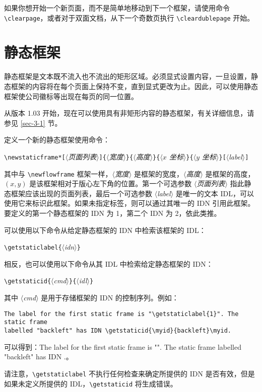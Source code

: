 \documentclass[a4paper]{book}%
\newcommand{\meta}[1]{\textnormal{\ensuremath{\langle}\makebox[0pt][l]{}\emph{#1}\makebox[0pt][l]{}\ensuremath{\rangle}}}
\begin{document}
如果你想开始一个新页面，而不是简单地移动到下一个框架，请使用命令 \verb|\clearpage|，或者对于双面文档，从下一个奇数页执行 \verb|\cleardublepage| 开始。
\section{静态框架}\label{sec-2-2}%
静态框架是文本既不流入也不流出的矩形区域。必须显式设置内容，一旦设置，静态框架的内容将在每个页面上保持不变，直到显式更改为止。因此，可以使用静态框架使公司徽标等出现在每页的同一位置。

从版本 1.03 开始，现在可以使用具有非矩形内容的静态框架，有关详细信息，请参见 \ref{sec-3-1} 节。

定义一个新的静态框架使用命令：
\begin{mdframed}
\verb|\newstaticframe*[|\meta{页面列表}\verb|]{|\meta{宽度}\verb|}{|\meta{高度}\verb|}{|\meta{$x$ 坐标}\verb|}{|\meta{$y$ 坐标}\verb|}[|\meta{label}\verb|]|
\end{mdframed}
其中与 \verb|\newflowframe| 框架一样，\meta{宽度} 是框架的宽度，\meta{高度} 是框架的高度，$(x,y)$ 是该框架相对于版心左下角的位置。第一个可选参数 \meta{页面列表} 指此静态框架应该出现的页面列表，最后一个可选参数 \meta{label} 是唯一的文本 IDL，可以使用它来标识此框架。如果未指定标签，则可以通过其唯一的 IDN 引用此框架。要定义的第一个静态框架的 IDN 为 1，第二个 IDN 为 2，依此类推。

可以使用以下命令从给定静态框架的 IDN 中检索该框架的 IDL：
\begin{mdframed}
\verb|\getstaticlabel{|\meta{idn}\verb|}|
\end{mdframed}
相反，也可以使用以下命令从其 IDL 中检索给定静态框架的 IDN：
\begin{mdframed}
\verb|\getstaticid{|\meta{cmd}\verb|}{|\meta{idl}\verb|}|
\end{mdframed}
其中 \meta{cmd} 是用于存储框架的 IDN 的控制序列。例如：
\begin{mdframed}[backgroundcolor=white]
\verb|The label for the first static frame is "\getstaticlabel{1}". The static frame|\\ \verb|labelled "backleft" has IDN \getstaticid{\myid}{backleft}\myid.|
\end{mdframed}
可以得到：The label for the first static frame is "". The static frame labelled "backleft" has IDN \myid.。

请注意，\verb|\getstaticlabel| 不执行任何检查来确定所提供的 IDN 是否有效，但是如果未定义所提供的 IDL，\verb|\getstaticid| 将生成错误。
\end{document}
